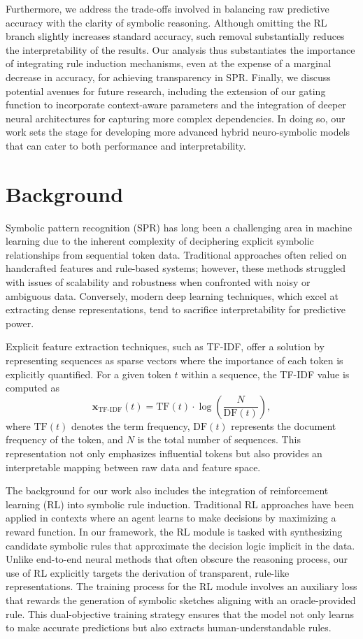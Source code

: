 \documentclass{article}
\begin{document}
Furthermore, we address the trade-offs involved in balancing raw predictive accuracy with the clarity of symbolic reasoning. Although omitting the RL branch slightly increases standard accuracy, such removal substantially reduces the interpretability of the results. Our analysis thus substantiates the importance of integrating rule induction mechanisms, even at the expense of a marginal decrease in accuracy, for achieving transparency in SPR. Finally, we discuss potential avenues for future research, including the extension of our gating function to incorporate context-aware parameters and the integration of deeper neural architectures for capturing more complex dependencies. In doing so, our work sets the stage for developing more advanced hybrid neuro-symbolic models that can cater to both performance and interpretability.

\section{Background}
Symbolic pattern recognition (SPR) has long been a challenging area in machine learning due to the inherent complexity of deciphering explicit symbolic relationships from sequential token data. Traditional approaches often relied on handcrafted features and rule-based systems; however, these methods struggled with issues of scalability and robustness when confronted with noisy or ambiguous data. Conversely, modern deep learning techniques, which excel at extracting dense representations, tend to sacrifice interpretability for predictive power.

Explicit feature extraction techniques, such as TF-IDF, offer a solution by representing sequences as sparse vectors where the importance of each token is explicitly quantified. For a given token \( t \) within a sequence, the TF-IDF value is computed as
\[
\mathbf{x}_{\text{TF-IDF}}(t) = \text{TF}(t) \cdot \log\left(\frac{N}{\text{DF}(t)}\right),
\]
where \(\text{TF}(t)\) denotes the term frequency, \(\text{DF}(t)\) represents the document frequency of the token, and \( N \) is the total number of sequences. This representation not only emphasizes influential tokens but also provides an interpretable mapping between raw data and feature space.

The background for our work also includes the integration of reinforcement learning (RL) into symbolic rule induction. Traditional RL approaches have been applied in contexts where an agent learns to make decisions by maximizing a reward function. In our framework, the RL module is tasked with synthesizing candidate symbolic rules that approximate the decision logic implicit in the data. Unlike end-to-end neural methods that often obscure the reasoning process, our use of RL explicitly targets the derivation of transparent, rule-like representations. The training process for the RL module involves an auxiliary loss that rewards the generation of symbolic sketches aligning with an oracle-provided rule. This dual-objective training strategy ensures that the model not only learns to make accurate predictions but also extracts human-understandable rules.
\end{document}
